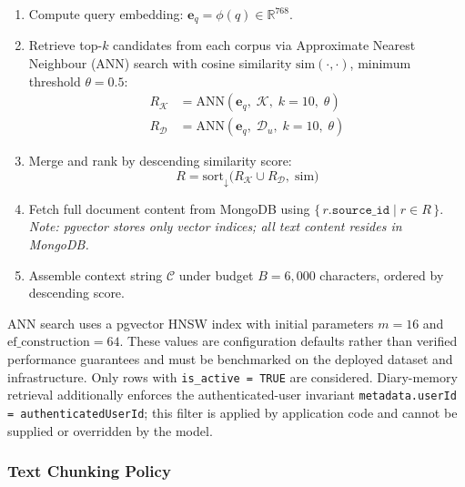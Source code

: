 \documentclass[conference]{IEEEtran}
\begin{document}
\begin{enumerate}
  \item Compute query embedding:
    $\mathbf{e}_q = \phi(q) \in \mathbb{R}^{768}$.

  \item Retrieve top-$k$ candidates from each corpus via Approximate
    Nearest Neighbour (ANN) search with cosine similarity
    $\text{sim}(\cdot,\cdot)$, minimum threshold $\theta = 0.5$:
    \begin{align}
      R_{\mathcal{K}} &= \mathrm{ANN}(\mathbf{e}_q,\;\mathcal{K},\;
        k{=}10,\;\theta) \label{eq:rk}\\
      R_{\mathcal{D}} &= \mathrm{ANN}(\mathbf{e}_q,\;\mathcal{D}_u,\;
        k{=}10,\;\theta) \label{eq:rd}
    \end{align}

  \item Merge and rank by descending similarity score:
    \begin{equation}
      R = \mathrm{sort}_{\downarrow}\!\bigl(R_{\mathcal{K}}
        \cup R_{\mathcal{D}},\;\text{sim}\bigr)
    \end{equation}

  \item Fetch full document content from MongoDB using
    $\{\,r.\texttt{source\_id} \mid r \in R\,\}$.
    \emph{Note: pgvector stores only vector indices; all text content
    resides in MongoDB.}

  \item Assemble context string $\mathcal{C}$ under budget
    $B = 6{,}000$ characters, ordered by descending score.
\end{enumerate}

ANN search uses a pgvector HNSW index with initial parameters
$m{=}16$ and $\mathrm{ef\_construction}{=}64$. These values are configuration defaults rather than verified performance guarantees and must be benchmarked on the deployed dataset and infrastructure. Only rows with \texttt{is\_active = TRUE} are considered. Diary-memory retrieval additionally enforces the authenticated-user invariant
\texttt{metadata.userId = authenticatedUserId}; this filter is applied by application code and cannot be supplied or overridden by the model.

\subsubsection{Text Chunking Policy}
\label{sec:chunking}
\end{document}
